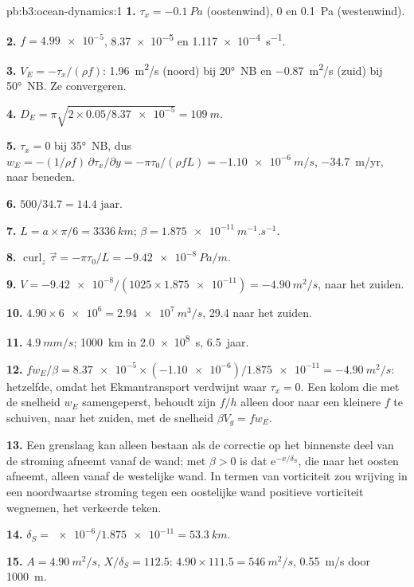\begin{solution}{pb:b3:ocean-dynamics:1}
\textbf{1.} $\tau_x = \qty{-0.1}{Pa}$ (oostenwind), 0 en \qty{+0.1}{Pa}
(westenwind).

\textbf{2.} $f = \num{4.99e-5}$, \num{8.37e-5} en
\qty{1.117e-4}{s^{-1}}.

\textbf{3.} $V_E = -\tau_x/(\rho f)$: \qty{+1.96}{m^2/s} (noord) bij
\ang{20}~NB en \qty{-0.87}{m^2/s} (zuid) bij \ang{50}~NB. Ze convergeren.

\textbf{4.} $D_E = \pi\sqrt{2\times0.05/\num{8.37e-5}} = \qty{109}{m}$.

\textbf{5.} $\tau_x = 0$ bij \ang{35}~NB, dus $w_E = -(1/\rho f)\,
\partial\tau_x/\partial y = -\pi\tau_0/(\rho fL) = \qty{-1.10e-6}{m/s}$,
\qty{-34.7}{m/yr}, naar beneden.

\textbf{6.} $500/34.7 = \num{14.4}\text{ jaar}$.

\textbf{7.} $L = a\times\pi/6 = \qty{3336}{km}$; $\beta =
\qty{1.875e-11}{m^{-1}.s^{-1}}$.

\textbf{8.} $\operatorname{curl}_z\vec\tau = -\pi\tau_0/L =
\qty{-9.42e-8}{Pa/m}$.

\textbf{9.} $V = \num{-9.42e-8}/(1025\times\num{1.875e-11}) =
\qty{-4.90}{m^2/s}$, naar het zuiden.

\textbf{10.} $4.90\times\num{6e6} = \qty{2.94e7}{m^3/s}$,
\qty{29.4}{\sverdrup} naar het zuiden.

\textbf{11.} $\qty{4.9}{mm/s}$; \qty{1000}{km} in \qty{2.0e8}{s},
\num{6.5}~jaar.

\textbf{12.} $fw_E/\beta = \num{8.37e-5}\times(\num{-1.10e-6})/
\num{1.875e-11} = \qty{-4.90}{m^2/s}$: hetzelfde, omdat het
Ekmantransport verdwijnt waar $\tau_x = 0$. Een kolom die met de snelheid $w_E$
samengeperst, behoudt zijn  $f/h$ alleen door naar een kleinere $f$ te schuiven, naar het zuiden,
met de snelheid $\beta V_g = fw_E$.

\textbf{13.} Een grenslaag kan alleen bestaan als de correctie op
het binnenste deel van de stroming afneemt vanaf de wand; met $\beta > 0$ is dat
$\mathrm e^{-x/\delta_S}$, die naar het oosten afneemt, alleen vanaf de westelijke
wand. In termen van vorticiteit zou wrijving in een noordwaartse stroming tegen een
oostelijke wand positieve vorticiteit wegnemen, het verkeerde teken.

\textbf{14.} $\delta_S = \num{e-6}/\num{1.875e-11} = \qty{53.3}{km}$.

\textbf{15.} $A = \qty{4.90}{m^2/s}$, $X/\delta_S = 112.5$:
$4.90\times111.5 = \qty{546}{m^2/s}$, \qty{0.55}{m/s} door
\qty{1000}{m}.


\end{solution}
